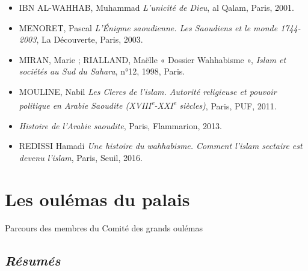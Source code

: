 \begin{itemize}
\item
 
  IBN AL-WAHHAB, Muhammad \emph{L'unicité de Dieu}, al Qalam, Paris,
  2001.
 


 \item
MENORET, Pascal \emph{L'Énigme saoudienne. Les Saoudiens et le monde
1744-2003}, La Découverte, Paris, 2003.
\item
MIRAN, Marie ; RIALLAND, Maëlle « Dossier Wahhabisme », \emph{Islam et
sociétés au Sud du Sahara}, n°12, 1998, Paris.
\item
MOULINE, Nabil \emph{Les Clercs de l'islam. Autorité religieuse et
pouvoir politique en Arabie Saoudite
(XVIII\textsuperscript{e}-XXI\textsuperscript{e} siècles)}, Paris, PUF,
2011.
\item
  \emph{Histoire de l'Arabie
saoudite}, Paris, Flammarion, 2013.
\item
REDISSI Hamadi \emph{Une histoire du wahhabisme. Comment l'islam
sectaire est devenu l'islam}, Paris, Seuil, 2016.
 \end{itemize}
 
 

\section{Les oulémas du palais}

Parcours des membres du Comité des grands oulémas

\hypertarget{ruxe9sumuxe9s}{%
\subsection{\texorpdfstring{\emph{Résumés}}{Résumés}}\label{ruxe9sumuxe9s}}


